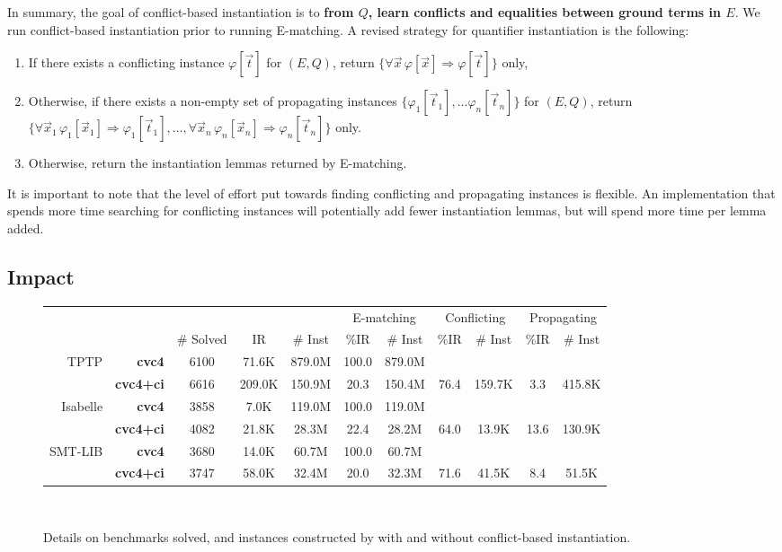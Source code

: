 \documentclass[oribibl]{llncs}
\begin{document}
In summary, the goal of conflict-based instantiation is to {\bf from $Q$, 
learn conflicts and equalities between ground terms in $E$}.
We run conflict-based instantiation prior to running E-matching.
A revised strategy for quantifier instantiation is the following:
\begin{enumerate}
\item If there exists a conflicting instance $\varphi[ \vec t ]$ for $( E, Q )$, 
return $\{ \forall \vec x\, \varphi[ \vec x ] \Rightarrow \varphi[ \vec t ] \}$ only,
\item Otherwise, if there exists a non-empty set of propagating instances $\{ \varphi_1[ \vec t_1 ], \ldots \varphi_n[ \vec t_n ] \}$ for $( E, Q )$,
return $\{ \forall \vec x_1\, \varphi_1[ \vec x_1 ] \Rightarrow \varphi_1[ \vec t_1 ], \ldots, \forall \vec x_n\, \varphi_n[ \vec x_n ] \Rightarrow \varphi_n[ \vec t_n ] \}$ only.
\item Otherwise, return the instantiation lemmas returned by E-matching.
\end{enumerate}
It is important to note that the level of effort put towards 
finding conflicting and propagating instances is flexible.
An implementation that spends more time searching for conflicting instances will potentially add fewer instantiation lemmas,
but will spend more time per lemma added.

\subsection{Impact}

\begin{figure}[t]
\centering
{%
\begin{tabular}{|r|r|c|cc|cc|cc|cc|}
\hline
  &  & & & & \multicolumn{2}{c|}{E-matching}  & \multicolumn{2}{c|}{Conflicting}  & \multicolumn{2}{c|}{Propagating}
\\
&   & \# Solved & IR & \# Inst & \%IR & \# Inst & \%IR & \# Inst & \%IR & \# Inst
\\
\hline 
 TPTP &  {\bf cvc4} & 6100 & 71.6K & 879.0M & 100.0 & 879.0M &  &  &  & 
\\
 & {\bf cvc4+ci} & 6616 & 209.0K & 150.9M & 20.3 & 150.4M & 76.4 & 159.7K & 3.3 & 415.8K
\\
\hline
 Isabelle & {\bf cvc4} & 3858 & 7.0K & 119.0M & 100.0 & 119.0M &  &  &  & 
\\
 & {\bf cvc4+ci} & 4082 & 21.8K & 28.3M & 22.4 & 28.2M & 64.0 & 13.9K & 13.6 & 130.9K
 \\
\hline
 SMT-LIB & {\bf cvc4} & 3680 & 14.0K & 60.7M & 100.0 & 60.7M &  &  &  & 
\\
 & {\bf cvc4+ci} & 3747 & 58.0K & 32.4M & 20.0 & 32.3M & 71.6 & 41.5K & 8.4 & 51.5K
\\
\hline
\end{tabular}
\\
}
\caption{
Details on benchmarks solved, and instances constructed by \cvc with and without conflict-based instantiation.
}
\label{fig:results-inst-detail}
\end{figure}
\end{document}
